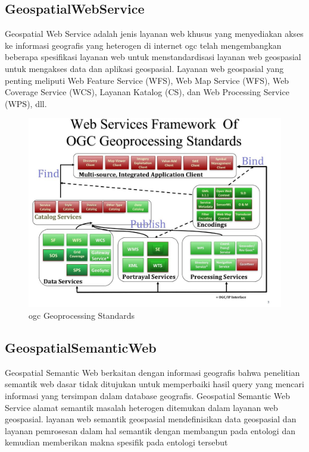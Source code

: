\subsection{GeospatialWebService}
\cite{lupp2008open} Geospatial Web Service
adalah jenis layanan web khusus yang menyediakan akses ke informasi geografis yang heterogen di internet ogc telah mengembangkan beberapa
spesifikasi layanan web untuk menstandardisasi layanan web geospasial untuk mengakses data dan aplikasi geospasial. 
Layanan web geospasial yang penting meliputi Web Feature Service (WFS), Web Map Service (WFS), Web Coverage Service (WCS), 
Layanan Katalog (CS), dan Web Processing Service (WPS), dll.

\begin{figure}[ht]
	\centerline{\includegraphics[width=1\textwidth]{figures/framework.JPG}}
	\caption{ogc Geoprocessing Standards}
	\label{framework}
	\end{figure}
	
\subsection{GeospatialSemanticWeb}
\cite{lupp2008open} Geospatial Semantic Web
berkaitan dengan informasi geografis bahwa penelitian semantik web dasar tidak ditujukan untuk memperbaiki 
hasil query yang mencari informasi yang tersimpan dalam database geografis.
Geospatial Semantic Web Service
alamat semantik masalah heterogen ditemukan dalam layanan web geospasial. 
layanan web semantik geospasial mendefinisikan data geospasial dan layanan pemrosesan dalam hal semantik dengan membangun 
pada entologi dan kemudian memberikan makna spesifik pada entologi tersebut


